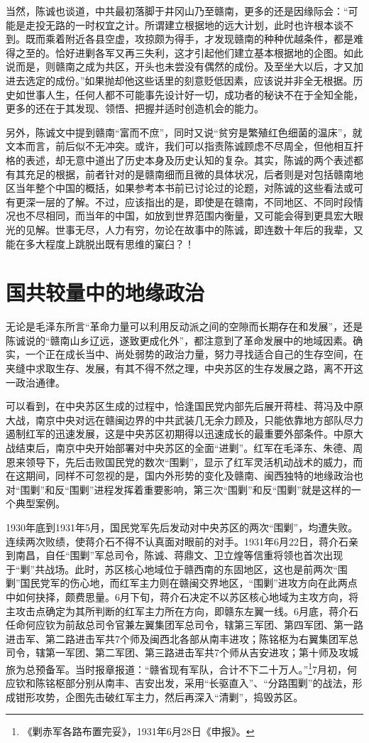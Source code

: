 当然，陈诚也谈道，中共最初落脚于井冈山乃至赣南，更多的还是因缘际会：“可能是走投无路的一时权宜之计。所谓建立根据地的远大计划，此时也许根本谈不到。既而乘着附近各县空虚，攻掠颇为得手，才发现赣南的种种优越条件，都是难得之至的。恰好进剿各军又再三失利，这才引起他们建立基本根据地的企图。如此说而是，则赣南之成为共区，开头也未尝没有偶然的成份。及至坐大以后，才又加进去选定的成份。”如果抛却他这些话里的刻意贬低因素，应该说并非全无根据。历史如世事人生，任何人都不可能事先设计好一切，成功者的秘诀不在于全知全能，更多的还在于其发现、领悟、把握并适时创造机会的能力。


另外，陈诚文中提到赣南“富而不庶”，同时又说“贫穷是繁殖红色细菌的温床”，就文本而言，前后似不无冲突。或许，我们可以指责陈诚顾虑不尽周全，但他相互扞格的表述，却无意中道出了历史本身及历史认知的复杂。其实，陈诚的两个表述都有其充足的根据，前者针对的是赣南细而且微的具体状况，后者则是对包括赣南地区当年整个中国的概括，如果参考本书前已讨论过的论题，对陈诚的这些看法或可有更深一层的了解。不过，应该指出的是，即使是在赣南，不同地区、不同时段情况也不尽相同，而当年的中国，如放到世界范围内衡量，又可能会得到更具宏大眼光的见解。世事无尽，人力有穷，勿论在故事中的陈诚，即连数十年后的我辈，又能在多大程度上跳脱出既有思维的窠臼？！

\section{国共较量中的地缘政治}


无论是毛泽东所言“革命力量可以利用反动派之间的空隙而长期存在和发展”，还是陈诚说的“赣南山乡辽远，遂致更成化外”，都注意到了革命发展中的地域因素。确实，一个正在成长当中、尚处弱势的政治力量，努力寻找适合自己的生存空间，在夹缝中求取生存、发展，有其不得不然之理，中央苏区的生存发展之路，离不开这一政治通律。


可以看到，在中央苏区生成的过程中，恰逢国民党内部先后展开蒋桂、蒋冯及中原大战，南京中央对远在赣闽边界的中共武装几无余力顾及，只能依靠地方部队尽力遏制红军的迅速发展，这是中央苏区初期得以迅速成长的最重要外部条件。中原大战结束后，南京中央开始部署对中央苏区的全面“进剿”。红军在毛泽东、朱德、周恩来领导下，先后击败国民党的数次“围剿”，显示了红军灵活机动战术的威力，而在这期间，同样不可忽视的是，国内外形势的变化及赣南、闽西独特的地缘政治也对“围剿”和反“围剿”进程发挥着重要影响，第三次“围剿”和反“围剿”就是这样的一个典型案例。


1930年底到1931年5月，国民党军先后发动对中央苏区的两次“围剿”，均遭失败。连续两次败绩，使蒋介石不得不认真面对眼前的对手。1931年6月22日，蒋介石亲到南昌，自任“围剿”军总司令，陈诚、蒋鼎文、卫立煌等信重将领也首次出现于“剿”共战场。此时，苏区核心地域位于赣西南的东固地区，这也是前两次“围剿”国民党军的伤心地，而红军主力则在赣闽交界地区，“围剿”进攻方向在此两点中如何抉择，颇费思量。6月下旬，蒋介石决定不以苏区核心地域为主攻方向，将主攻击点确定为其所判断的红军主力所在方向，即赣东左翼一线。6月底，蒋介石任命何应钦为前敌总司令官兼左翼集团军总司令，辖第三军团、第四军团、第一路进击军、第二路进击军共7个师及闽西北各部从南丰进攻；陈铭枢为右翼集团军总司令，辖第一军团、第二军团、第三路进击军共7个师从吉安进攻；第十师及攻城旅为总预备军。当时报章报道：“赣省现有军队，合计不下二十万人。”\footnote{《剿赤军各路布置完妥》，1931年6月28日《申报》。}7月初，何应钦和陈铭枢部分别从南丰、吉安出发，采用“长驱直入”、“分路围剿”的战法，形成钳形攻势，企图先击破红军主力，然后再深入“清剿”，捣毁苏区。


